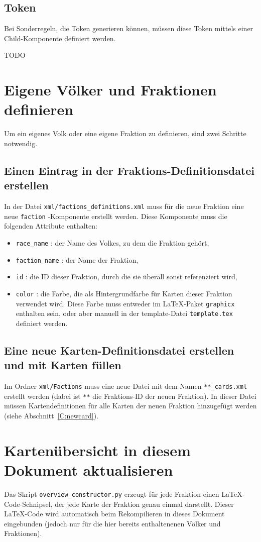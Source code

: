 \documentclass[a4paper,11pt]{report}
\newcommand{\sref}[1]{Abschnitt~\ref{#1}}
\begin{document}
\subsection{Token}
Bei Sonderregeln, die Token generieren können, müssen diese Token mittels einer Child-Komponente definiert werden.

TODO

\section{Eigene Völker und Fraktionen definieren}
Um ein eigenes Volk oder eine eigene Fraktion zu definieren, sind zwei Schritte notwendig.

\subsection{Einen Eintrag in der Fraktions-Definitionsdatei erstellen}
In der Datei \verb+xml/factions_definitions.xml+ muss für die neue Fraktion eine neue \verb+faction+ -Komponente erstellt werden. Diese Komponente muss die folgenden Attribute enthalten:
\begin{itemize}
	\item \verb+race_name+ : der Name des Volkes, zu dem die Fraktion gehört,
	\item \verb+faction_name+ : der Name der Fraktion,
	\item \verb+id+ : die ID dieser Fraktion, durch die sie überall sonst referenziert wird,
	\item \verb+color+ : die Farbe, die als Hintergrundfarbe für Karten dieser Fraktion verwendet wird. Diese Farbe muss entweder im \LaTeX -Paket \verb+graphicx+ enthalten sein, oder aber manuell in der template-Datei \verb+template.tex+ definiert werden.
\end{itemize}

\subsection{Eine neue Karten-Definitionsdatei erstellen und mit Karten füllen}
Im Ordner \verb+xml/Factions+ muss eine neue Datei mit dem Namen \verb+**_cards.xml+ erstellt werden (dabei ist \verb+**+ die Fraktions-ID der neuen Fraktion). In dieser Datei müssen Kartendefinitionen für alle Karten der neuen Fraktion hinzugefügt werden (siehe \sref{C:newcard}).

\section{Kartenübersicht in diesem Dokument aktualisieren}
Das Skript \verb+overview_constructor.py+ erzeugt für jede Fraktion einen \LaTeX -Code-Schnipsel, der jede Karte der Fraktion genau einmal darstellt. Dieser \LaTeX -Code wird automatisch beim Rekompilieren in dieses Dokument eingebunden (jedoch nur für die hier bereits enthaltenenen Völker und Fraktionen). 
\end{document}
